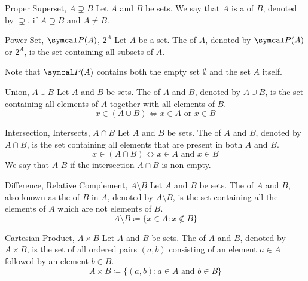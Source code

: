 \documentclass[12pt]{report}
\begin{document}
\begin{dfnbox}{Proper Superset, $A \supsetneq B$}
	Let $A$ and $B$ be sets. We say that $A$ is a  of $B$, denoted by $\supsetneq$, if $A \supseteq B$ and $A \ne B$.
\end{dfnbox}

\begin{dfnbox}{Power Set, $\powerset(A)$, $2^A$}
	Let $A$ be a set. The  of $A$, denoted by $\powerset(A)$ or $2^A$, is the set containing all subsets of $A$.
\end{dfnbox}

Note that $\powerset(A)$ contains both the empty set $\emptyset$ and the set $A$ itself.

\begin{dfnbox}{Union, $A \cup B$}
	Let $A$ and $B$ be sets. The  of $A$ and $B$, denoted by $A \cup B$, is the set containing all elements of $A$ together with all elements of $B$.
	\[ x \in (A \cup B) \iff x \in A \text{ or } x \in B \]
\end{dfnbox}

\begin{dfnbox}{Intersection, Intersects, $A \cap B$}
	Let $A$ and $B$ be sets. The  of $A$ and $B$, denoted by $A \cap B$, is the set containing all elements that are present in both $A$ and $B$.
	\[ x \in (A \cap B) \iff x \in A \text{ and } x \in B \]
	We say that $A$  $B$ if the intersection $A \cap B$ is non-empty.
\end{dfnbox}

\begin{dfnbox}{Difference, Relative Complement, $A \setminus B$}
	Let $A$ and $B$ be sets. The  of $A$ and $B$, also known as the  of $B$ in $A$, denoted by $A \setminus B$, is the set containing all the elements of $A$ which are not elements of $B$.
	\[ A \setminus B \coloneq \{ x \in A : x \notin B \} \]
\end{dfnbox}

\begin{dfnbox}{Cartesian Product, $A \times B$}
	Let $A$ and $B$ be sets. The  of $A$ and $B$, denoted by $A \times B$, is the set of all ordered pairs $(a, b)$ consisting of an element $a \in A$ followed by an element $b \in B$.
	\[ A \times B \coloneq \{ (a, b) : a \in A \text{ and } b \in B \} \]
\end{dfnbox}
\end{document}

